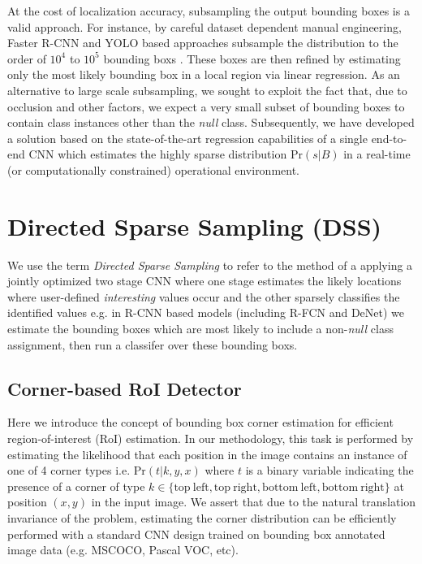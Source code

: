 \documentclass[10pt,twocolumn]{article}
\begin{document}
At the cost of localization accuracy, subsampling the output bounding boxes is a valid approach. 
For instance, by careful dataset dependent manual engineering, Faster R-CNN and YOLO based approaches subsample the distribution to the order of $10^4$ to $10^5$ bounding boxs \cite{yolo} \cite{faster-rcnn}. These boxes are then refined by estimating only the most likely bounding box in a local region via linear regression. As an alternative to large scale subsampling, we sought to exploit the fact that, due to occlusion and other factors, we expect a very small subset of bounding boxes to contain class instances other than the \textit{null} class. Subsequently, we have developed a solution based on the state-of-the-art regression capabilities of a single end-to-end CNN which estimates the highly sparse distribution $\mathrm{Pr}(s | B)$ in a real-time (or computationally constrained) operational environment.


\section{Directed Sparse Sampling (DSS)} \label{sec:dss}

We use the term \textit{Directed Sparse Sampling} to refer to the method of a applying a jointly optimized two stage CNN where one stage estimates the likely locations where user-defined \textit{interesting} values occur and the other sparsely classifies the identified values e.g. in R-CNN based models (including R-FCN and DeNet) we estimate the bounding boxes which are most likely to include a non-\textit{null} class assignment, then run a classifer over these bounding boxs. 

\subsection{Corner-based RoI Detector}
Here we introduce the concept of bounding box corner estimation for efficient region-of-interest (RoI) estimation. In our methodology, this task is performed by estimating the likelihood that each position in the image contains an instance of one of 4 corner types i.e. $\mathrm{Pr}(t | k,y,x)$ where $t$ is a binary variable indicating the presence of a corner of type $k \in \lbrace \mathrm{top~left}, \mathrm{top~right}, \mathrm{bottom~left}, \mathrm{bottom~right} \rbrace$ at position $(x,y)$ in the input image. We assert that due to the natural translation invariance of the problem, estimating the corner distribution can be efficiently performed with a standard CNN design trained on bounding box annotated image data (e.g. MSCOCO\cite{mscoco}, Pascal VOC\cite{pascal-voc}, etc). 
\end{document}
